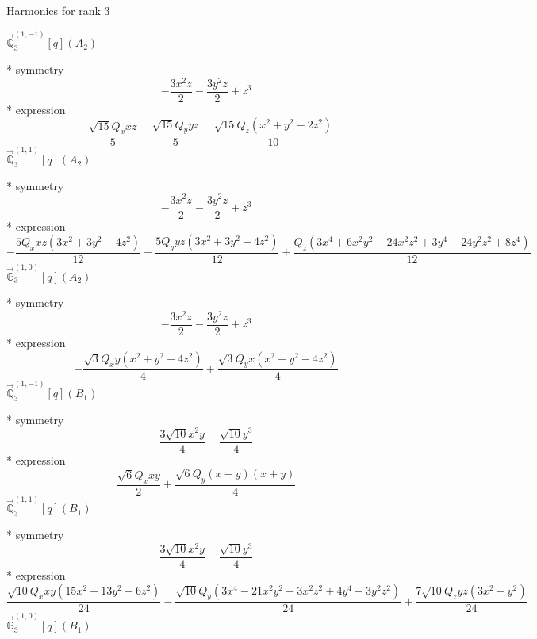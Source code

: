 \documentclass[fleqn,8pt]{jsarticle}
\begin{document}
\noindent * Harmonics for rank 3

\noindent\quad $\vec{\mathbb{Q}}_{3}^{(1,-1)}[q](A_{2})$

\noindent\quad ** symmetry
\begin{dmath*}
- \frac{3 x^{2} z}{2} - \frac{3 y^{2} z}{2} + z^{3}
\end{dmath*}
\noindent\quad ** expression
\begin{dmath*}
- \frac{\sqrt{15} Q_{x} x z}{5} - \frac{\sqrt{15} Q_{y} y z}{5} - \frac{\sqrt{15} Q_{z} \left(x^{2} + y^{2} - 2 z^{2}\right)}{10}
\end{dmath*}
\noindent\quad $\vec{\mathbb{Q}}_{3}^{(1,1)}[q](A_{2})$

\noindent\quad ** symmetry
\begin{dmath*}
- \frac{3 x^{2} z}{2} - \frac{3 y^{2} z}{2} + z^{3}
\end{dmath*}
\noindent\quad ** expression
\begin{dmath*}
- \frac{5 Q_{x} x z \left(3 x^{2} + 3 y^{2} - 4 z^{2}\right)}{12} - \frac{5 Q_{y} y z \left(3 x^{2} + 3 y^{2} - 4 z^{2}\right)}{12} + \frac{Q_{z} \left(3 x^{4} + 6 x^{2} y^{2} - 24 x^{2} z^{2} + 3 y^{4} - 24 y^{2} z^{2} + 8 z^{4}\right)}{12}
\end{dmath*}
\noindent\quad $\vec{\mathbb{G}}_{3}^{(1,0)}[q](A_{2})$

\noindent\quad ** symmetry
\begin{dmath*}
- \frac{3 x^{2} z}{2} - \frac{3 y^{2} z}{2} + z^{3}
\end{dmath*}
\noindent\quad ** expression
\begin{dmath*}
- \frac{\sqrt{3} Q_{x} y \left(x^{2} + y^{2} - 4 z^{2}\right)}{4} + \frac{\sqrt{3} Q_{y} x \left(x^{2} + y^{2} - 4 z^{2}\right)}{4}
\end{dmath*}
\noindent\quad $\vec{\mathbb{Q}}_{3}^{(1,-1)}[q](B_{1})$

\noindent\quad ** symmetry
\begin{dmath*}
\frac{3 \sqrt{10} x^{2} y}{4} - \frac{\sqrt{10} y^{3}}{4}
\end{dmath*}
\noindent\quad ** expression
\begin{dmath*}
\frac{\sqrt{6} Q_{x} x y}{2} + \frac{\sqrt{6} Q_{y} \left(x - y\right) \left(x + y\right)}{4}
\end{dmath*}
\noindent\quad $\vec{\mathbb{Q}}_{3}^{(1,1)}[q](B_{1})$

\noindent\quad ** symmetry
\begin{dmath*}
\frac{3 \sqrt{10} x^{2} y}{4} - \frac{\sqrt{10} y^{3}}{4}
\end{dmath*}
\noindent\quad ** expression
\begin{dmath*}
\frac{\sqrt{10} Q_{x} x y \left(15 x^{2} - 13 y^{2} - 6 z^{2}\right)}{24} - \frac{\sqrt{10} Q_{y} \left(3 x^{4} - 21 x^{2} y^{2} + 3 x^{2} z^{2} + 4 y^{4} - 3 y^{2} z^{2}\right)}{24} + \frac{7 \sqrt{10} Q_{z} y z \left(3 x^{2} - y^{2}\right)}{24}
\end{dmath*}
\noindent\quad $\vec{\mathbb{G}}_{3}^{(1,0)}[q](B_{1})$
\end{document}
